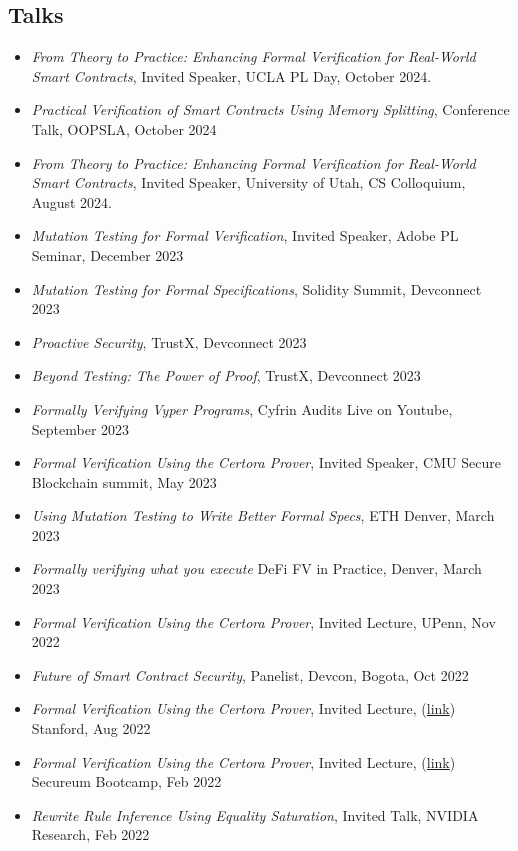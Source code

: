 \documentclass[margin, 10pt]{res} %
\begin{document}
\begin{resume}
\section{Talks}
 \begin{itemize}[itemsep=.7pt]
 \item{\sl From Theory to Practice: Enhancing Formal Verification for Real-World Smart Contracts}, Invited Speaker, UCLA PL Day, October 2024.
 \item{\sl Practical Verification of Smart Contracts Using Memory Splitting}, Conference Talk, OOPSLA, October 2024
 \item{\sl From Theory to Practice: Enhancing Formal Verification for Real-World Smart Contracts}, Invited Speaker, University of Utah, CS Colloquium, August 2024.
 \item{\sl Mutation Testing for Formal Verification}, Invited Speaker, Adobe PL Seminar, December 2023
 \item{\sl Mutation Testing for Formal Specifications}, Solidity Summit, Devconnect 2023
 \item{\sl Proactive Security}, TrustX, Devconnect 2023
 \item{\sl Beyond Testing: The Power of Proof}, TrustX, Devconnect 2023
 \item{\sl Formally Verifying Vyper Programs}, Cyfrin Audits Live on Youtube, September 2023
 \item{\sl Formal Verification Using the Certora Prover}, Invited Speaker, CMU Secure Blockchain summit, May 2023
 \item{\sl Using Mutation Testing to Write Better Formal Specs}, ETH Denver, March 2023
 \item{\sl Formally verifying what you execute} DeFi FV in Practice, Denver, March 2023
 \item{\sl Formal Verification Using the Certora Prover}, Invited Lecture, UPenn, Nov 2022
 \item{\sl Future of Smart Contract Security}, Panelist, Devcon, Bogota, Oct 2022
 \item {\sl Formal Verification Using the Certora Prover}, Invited Lecture,
   (\href{https://www.certora.com/events/certora-prover-2-day-workshop/}{link})
   Stanford, Aug 2022
 \item {\sl Formal Verification Using the Certora Prover}, Invited Lecture,
   (\href{https://github.com/Certora/Tutorials/tree/master/05.Lesson_GettingFamiliarWithCVT}{link})
   Secureum Bootcamp, Feb 2022
 \item {\sl Rewrite Rule Inference Using Equality Saturation}, Invited Talk, NVIDIA Research, Feb 2022

\end{itemize}
\end{resume}
\end{document}
